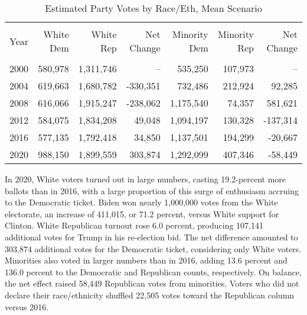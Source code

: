 \begin{table}[ht]
\centering
\begin{threeparttable}
\caption{Estimated Party Votes by Race/Eth, Mean Scenario}  
\label{tab:mid-white}
\begin{tabular}{rrrrrrr}
  \hline \\ \vspace{0.5em} 
Year & White Dem & White Rep & Net Change & Minority Dem  & Minority Rep  & Net Change \vspace{0.5em} \\ 
  \hline   \\
2000 & 580,978 & 1,311,746 &   -- & 535,250 & 107,973 &   -- \\ 
  2004 & 619,663 & 1,680,782 & -330,351 & 732,486 & 212,924 & 92,285 \\ 
  2008 & 616,066 & 1,915,247 & -238,062 & 1,175,540 & 74,357 & 581,621 \\ 
  2012 & 584,075 & 1,834,208 & 49,048 & 1,094,197 & 130,328 & -137,314 \\ 
  2016 & 577,135 & 1,792,418 & 34,850 & 1,137,501 & 194,299 & -20,667 \\ 
  2020 & 988,150 & 1,899,559 & 303,874 & 1,292,099 & 407,346 & -58,449   \vspace{0.5em} \\ 
   \hline

\end{tabular}
\end{threeparttable}

\end{table}




In 2020, White voters turned out in large numbers, casting 19.2-percent more ballots than in 2016, with a large proportion of this surge of enthusiasm accruing to the Democratic ticket. Biden won nearly 1,000,000 votes from the White electorate, an increase of 411,015, or 71.2 percent, versus White support for Clinton. White Republican turnout rose 6.0 percent, producing 107,141 additional votes for Trump in his re-election bid. The net difference amounted to 303,874 additional votes for the Democratic ticket, considering only White voters. Minorities also voted in larger numbers than in 2016, adding 13.6 percent and 136.0 percent to the Democratic and Republican counts, respectively. On balance, the net effect raised 58,449 Republican votes from minorities. Voters who did not declare their race/ethnicity shuffled 22,505 votes toward the Republican column versus 2016. 

